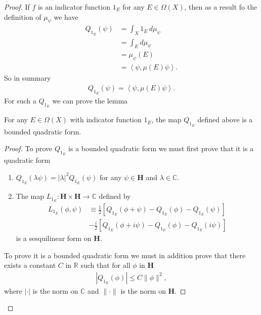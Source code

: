 \begin{proof}
    If $f$ is an indicator function $1_E$ for any $E \in \Omega(X)$, then as a result fo the definition of $\mu_\psi$ we have
    \begin{align}
        Q_{1_E}(\psi) &= \int_X 1_E \, d\mu_\psi \\
                      &= \int_E d\mu_\psi \\
                      &= \mu_\psi(E) \\
                      &= \left< \psi, \mu(E) \psi \right>.
    \end{align}
    So in summary
    \begin{align}
        Q_{1_E}(\psi) = \left< \psi, \mu(E) \psi \right>.
    \end{align}
    For such a $Q_{1_E}$ we can prove the lemma
    \begin{lemma}
        For any $E \in \Omega(X)$ with indicator function $1_E$, the map $Q_{1_E}$ defined above is a bounded quadratic form.
    \end{lemma}
    \begin{proof}
        To prove $Q_{1_E}$ is a bounded quadratic form we must first prove that it is a quadratic form
        \begin{enumerate}
            \item $Q_{1_E}(\lambda\psi) = |\lambda|^2 Q_{1_E}(\psi)$ for any $\psi \in \mathbf{H}$ and $\lambda \in \mathbb{C}$.
            \item The map $L_{1_E} : \mathbf{H} \times \mathbf{H} \rightarrow \mathbb{C}$ defined by
                \begin{align}
                    L_{1_E}(\phi, \psi) &\equiv \frac{1}{2} \left[ Q_{1_E}(\phi + \psi) - Q_{1_E}(\phi) - Q_{1_E}(\psi) \right] \\
                                        &-\frac{i}{2} \left[ Q_{1_E}(\phi + i\psi) - Q_{1_E}(\phi) - Q_{1_E}(i\psi) \right]
                \end{align}
                is a sesquilinear form on $\mathbf{H}$.
        \end{enumerate}
        To prove it is a bounded quadratic form we must in addition prove that there exists a constant $C$ in $\mathbb{R}$ such that for all $\phi$ in $\mathbf{H}$
        \begin{align}
            |Q_{1_E}(\phi)| \le C \|\phi\|^2,
        \end{align}
        where $|\cdot|$ is the norm on $\mathbb{C}$ and $\|\cdot\|$ is the norm on $\mathbf{H}$.


\end{proof}
\end{proof}
